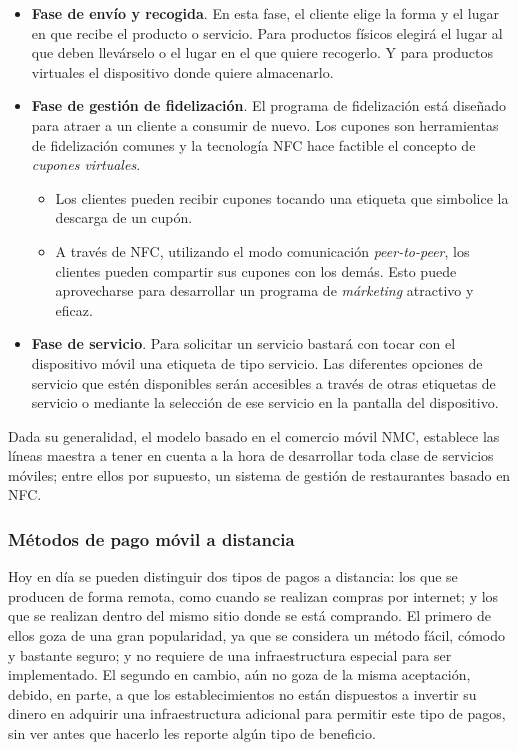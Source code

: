 \begin{itemize}
\begin{itemize}
    \end{itemize}
  \item \textbf{Fase de envío y recogida}. En esta fase, el cliente elige
  la forma y el lugar en que recibe el producto o servicio. Para productos
  físicos elegirá el lugar al que deben llevárselo o el lugar en el que quiere
  recogerlo. Y para productos virtuales el dispositivo donde quiere
  almacenarlo.
  \item \textbf{Fase de gestión de fidelización}. El programa de fidelización
  está diseñado para atraer a un cliente a consumir de nuevo. Los cupones son
  herramientas de fidelización comunes y la tecnología \acs{NFC} hace factible
  el concepto de \emph{cupones virtuales}.
    \begin{itemize}
    \item Los clientes pueden recibir cupones tocando una etiqueta que 
    simbolice la descarga de un cupón.
    \item A través de \acs{NFC}, utilizando el modo comunicación
    \emph{peer-to-peer}, los clientes pueden compartir sus cupones con los
    demás. Esto puede aprovecharse para desarrollar un programa de
    \emph{márketing} atractivo y eficaz.
    \end{itemize}
  \item \textbf{Fase de servicio}. Para solicitar un servicio bastará con
  tocar con el dispositivo móvil una etiqueta de tipo servicio. Las diferentes
  opciones de servicio que estén disponibles serán accesibles a través de
  otras etiquetas de servicio o mediante la selección de ese servicio en la
  pantalla del dispositivo.
  \end{itemize}
  
  Dada su generalidad, el modelo basado en el comercio móvil \acs{NMC},
  establece las líneas maestra a tener en cuenta a la hora de desarrollar
  toda clase de servicios móviles; entre ellos por supuesto, un sistema de 
  gestión de restaurantes basado en \acs{NFC}.

    \subsubsection{Métodos de pago móvil a distancia}
  Hoy en día se pueden distinguir dos tipos de pagos a distancia: los que se
  producen de forma remota, como cuando se realizan compras por internet;
  y los que se realizan dentro del mismo sitio donde se está
  comprando. El primero de ellos goza de una gran popularidad, ya que se
  considera un método fácil, cómodo y bastante seguro; y no requiere de una
  infraestructura especial para ser implementado. El segundo en cambio,
  aún no goza de la misma aceptación, debido, en parte, a que los 
  establecimientos no están dispuestos a invertir su dinero en adquirir una 
  infraestructura adicional para permitir este tipo de pagos, sin ver antes 
  que hacerlo les reporte algún tipo de beneficio.

